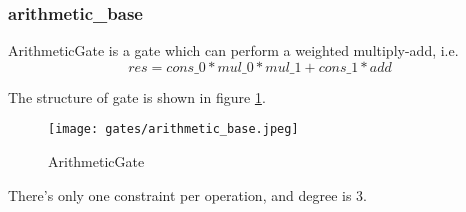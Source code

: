 \subsubsection{arithmetic\_base}

ArithmeticGate is a gate which can perform a weighted multiply-add, i.e.
\[res = cons\_0 * mul\_0 * mul\_1 + cons\_1 * add\]

The structure of gate is shown in figure \ref{fig:arthmetic-gate}.

\begin{figure}[!ht]
    \centering
    \texttt{[image: gates/arithmetic\_base.jpeg]}
    \caption{ArithmeticGate}
    \label{fig:arthmetic-gate}
\end{figure}

There's only one constraint per operation, and degree is 3.